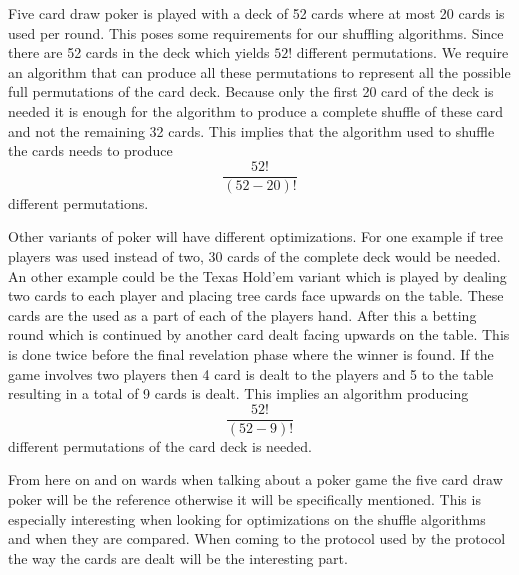 Five card draw poker is played with a deck of 52 cards where at most 20 cards is used per round. This poses some requirements for our shuffling algorithms. Since there are 52 cards in the deck which yields $52!$ different permutations. We require an algorithm that can produce all these permutations to represent all the possible full permutations of the card deck. Because only the first 20 card of the deck is needed it is enough for the algorithm to produce a complete shuffle of these card and not the remaining 32 cards. This implies that the algorithm used to shuffle the cards needs to produce $$\frac{52!}{(52-20)!}$$ different permutations.

Other variants of poker will have different optimizations. For one example if tree players was used instead of two, 30 cards of the complete deck would be needed. An other example could be the Texas Hold'em variant which is played by dealing two cards to each player and placing tree cards face upwards on the table. These cards are the used as a part of each of the players hand. After this a betting round which is continued by another card dealt facing upwards on the table. This is done twice before the final revelation phase where the winner is found. If the game involves two players then 4 card is dealt to the players and 5 to the table resulting in a total of 9 cards is dealt. This implies an algorithm producing $$\frac{52!}{(52-9)!}$$ different permutations of the card deck is needed.

From here on and on wards when talking about a poker game the five card draw poker will be the reference otherwise it will be specifically mentioned. This is especially interesting when looking for optimizations on the shuffle algorithms and when they are compared. When coming to the protocol used by the protocol the way the cards are dealt will be the interesting part.